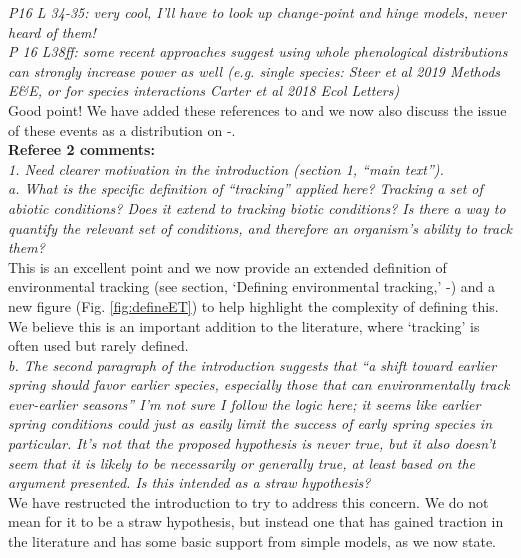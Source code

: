 \documentclass[11pt]{article}
\begin{document}
\emph{P16 L 34-35: very cool, I'll have to look up change-point and hinge models, never heard of
them!}\\

\emph{P 16 L38ff: some recent approaches suggest using whole phenological distributions can
strongly increase power as well (e.g. single species: Steer et al 2019 Methods E\&E, or for
species interactions Carter et al 2018 Ecol Letters)}\\

Good point! We have added these references to  and we now also discuss the issue of these events as a distribution on -. \\

{\bf Referee 2 comments:} \\


\emph{1.      Need clearer motivation in the introduction (section 1, ``main text'').\\
a.      What is the specific definition of “tracking” applied here? Tracking a set of abiotic
conditions? Does it extend to tracking biotic conditions? Is there a way to quantify the
relevant set of conditions, and therefore an organism's ability to track them?}\\

This is an excellent point and we now provide an extended definition of environmental tracking (see section, `Defining environmental tracking,' -) and a new figure (Fig. \ref{fig:defineET}) to help highlight the complexity of defining this. We believe this is an important addition to the literature, where `tracking' is often used but rarely defined. \\
 
\emph{b.      The second paragraph of the introduction suggests that ``a shift toward earlier spring
should favor earlier species, especially those that can environmentally track ever-earlier
seasons'' I'm not sure I follow the logic here; it seems like earlier spring conditions could
just as easily limit the success of early spring species in particular. It's not that the
proposed hypothesis is never true, but it also doesn't seem that it is likely to be
necessarily or generally true, at least based on the argument presented. Is this intended as
a straw hypothesis?}\\

We have restructed the introduction to try to address this concern. We do not mean for it to be a straw hypothesis, but instead one that has gained traction in the literature and has some basic support from simple models, as we now state.\\
\end{document}
